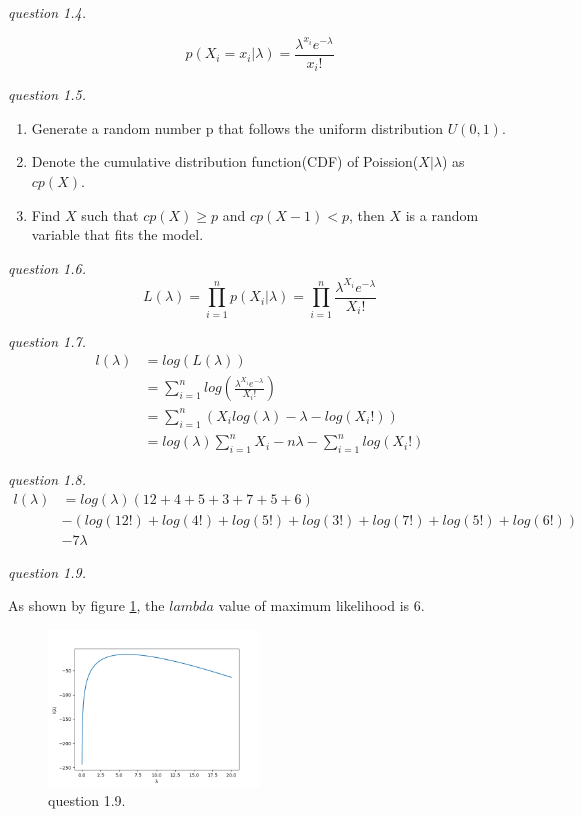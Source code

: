 \documentclass{article}
\begin{document}
\vspace{\baselineskip}
\textit{question 1.4.}

$$p(X_i=x_i|\lambda) = \frac{\lambda^{x_i}e^{-\lambda}}{x_i!}$$

\vspace{\baselineskip}
\textit{question 1.5.}

\begin{enumerate}
    \item Generate a random number p that follows the uniform distribution $U(0, 1)$.
    \item Denote the cumulative distribution function(CDF) of Poission($X|\lambda$) as $cp(X)$.
    \item Find $X$ such that $cp(X)\geq p$ and $cp(X-1)<p$, then $X$ is a random variable that fits the model.
\end{enumerate}
  
\vspace{\baselineskip}
\textit{question 1.6.}
$$L(\lambda)=\prod_{i=1}^np(X_i|\lambda)=\prod_{i=1}^n\frac{\lambda^{X_i}e^{-\lambda}}{X_i!}$$

\vspace{\baselineskip}
\textit{question 1.7.}
\begin{align*}
    l(\lambda)&=log(L(\lambda))\\&=\sum_{i=1}^nlog(\frac{\lambda^{X_i}e^{-\lambda}}{X_i!})\\&=\sum_{i=1}^n(X_ilog(\lambda) - \lambda - log(X_i!))\\&= log(\lambda)\sum_{i=1}^n X_i - n\lambda - \sum_{i=1}^nlog(X_i!)
\end{align*}

\vspace{\baselineskip}
\textit{question 1.8.}
\begin{align*}
    l(\lambda)&=log(\lambda)(12+4+5+3+7+5+6) \\&- (log(12!)+log(4!)+log(5!)+log(3!)+log(7!)+log(5!)+log(6!)) \\&- 7\lambda
\end{align*}

\vspace{\baselineskip}
\textit{question 1.9.}

As shown by figure \ref{fig:1-9}, the $lambda$ value of maximum likelihood is 6.

\begin{figure}[H]
    \centering
    \includegraphics[width=0.5\textwidth]{1-9}
    \caption{question 1.9.}
    \label{fig:1-9}
\end{figure}
\end{document}
